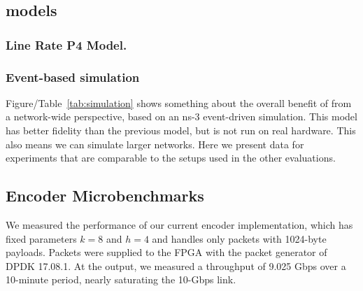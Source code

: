 \subsection{\OurSys models}

\subsubsection{Line Rate P4 Model.} 




\subsubsection{Event-based simulation}
Figure/Table~\ref{tab:simulation} shows something about the overall benefit of \OurSys from a network-wide perspective, based on an ns-3 event-driven simulation.
This model has better fidelity than the previous model, but is not run on real hardware. This also means we can simulate larger networks. Here we present data for experiments that are comparable to the setups used in the other evaluations.


\subsection{Encoder Microbenchmarks}

We measured the performance of our current encoder implementation, which
has fixed parameters $k = 8$ and $h = 4$ and handles only packets with 1024-byte payloads.
Packets were supplied to the FPGA with the packet generator of DPDK 17.08.1.
At the output, we measured a throughput of 9.025 Gbps over a 10-minute period,
nearly saturating the 10-Gbps link.

